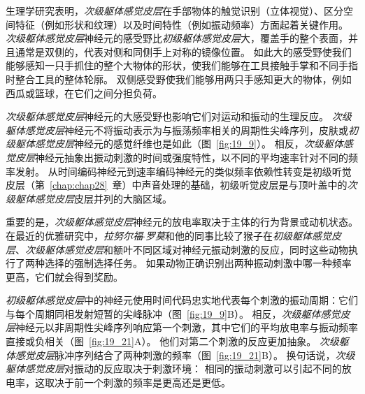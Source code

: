 生理学研究表明，\textit{次级躯体感觉皮层}在手部物体的触觉识别（立体视觉）、区分空间特征（例如形状和纹理）以及时间特性（例如振动频率）方面起着关键作用。
\textit{次级躯体感觉皮层}神经元的感受野比\textit{初级躯体感觉皮层}大，覆盖手的整个表面，并且通常是双侧的，代表对侧和同侧手上对称的镜像位置。
如此大的感受野使我们能够感知一只手抓住的整个大物体的形状，使我们能够在工具接触手掌和不同手指时整合工具的整体轮廓。
双侧感受野使我们能够用两只手感知更大的物体，例如西瓜或篮球，在它们之间分担负荷。


\textit{次级躯体感觉皮层}神经元的大感受野也影响它们对运动和振动的生理反应。
\textit{次级躯体感觉皮层}神经元不将振动表示为与振荡频率相关的周期性尖峰序列，皮肤或\textit{初级躯体感觉皮层}神经元的感觉纤维也是如此（图~\ref{fig:19_9}）。
相反，\textit{次级躯体感觉皮层}神经元抽象出振动刺激的时间或强度特性，以不同的平均速率针对不同的频率发射。
从时间编码神经元到速率编码神经元的类似频率依赖性转变是初级听觉皮层（第~\ref{chap:chap28}~章）中声音处理的基础，初级听觉皮层是与顶叶盖中的\textit{次级躯体感觉皮层}皮层并列的大脑区域。


重要的是，\textit{次级躯体感觉皮层}神经元的放电率取决于主体的行为背景或动机状态。
在最近的优雅研究中，\textit{拉努尔福$\cdot$罗莫}和他的同事比较了猴子在\textit{初级躯体感觉皮层}、\textit{次级躯体感觉皮层}和额叶不同区域对神经元振动刺激的反应，同时这些动物执行了两种选择的强制选择任务。
如果动物正确识别出两种振动刺激中哪一种频率更高，它们就会得到奖励。


\textit{初级躯体感觉皮层}中的神经元使用时间代码忠实地代表每个刺激的振动周期：它们与每个周期同相发射短暂的尖峰脉冲（图~\ref{fig:19_9}B）。
相反，\textit{次级躯体感觉皮层}神经元以非周期性尖峰序列响应第一个刺激，其中它们的平均放电率与振动频率直接或负相关（图~\ref{fig:19_21}A）。
他们对第二个刺激的反应更加抽象。
\textit{次级躯体感觉皮层}脉冲序列结合了两种刺激的频率（图~\ref{fig:19_21}B）。
换句话说，\textit{次级躯体感觉皮层}对振动的反应取决于刺激环境：
相同的振动刺激可以引起不同的放电率，这取决于前一个刺激的频率是更高还是更低。



